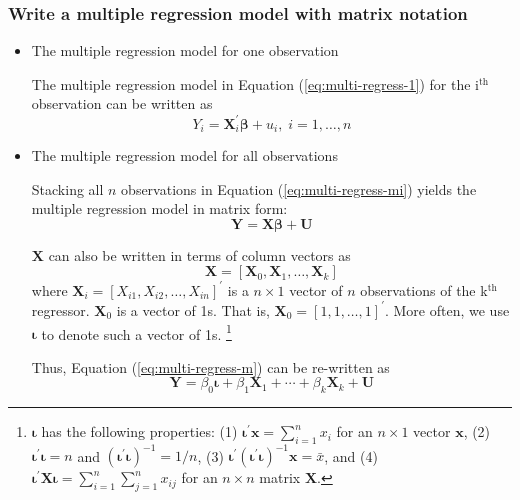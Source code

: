 \documentclass[a4paper,11pt]{article}
\begin{document}
\subsubsection*{Write a multiple regression model with matrix notation}
\label{sec:org8f35142}
\begin{itemize}
\item The multiple regression model for one observation
\label{sec:org8a2f15a}

The multiple regression model in Equation (\ref{eq:multi-regress-1})
for the i\(^{\text{th}}\) observation can be written as
\begin{equation}
\label{eq:multi-regress-mi}
Y_i = \mathbf{X}^{\prime}_i \boldsymbol{\beta} + u_i,\; i = 1, \ldots, n
\end{equation}

\item The multiple regression model for all observations
\label{sec:orgfdb6a2c}

Stacking all \(n\) observations in Equation (\ref{eq:multi-regress-mi})
yields the multiple regression model in matrix form:
\begin{equation}
\label{eq:multi-regress-m}
\mathbf{Y} = \mathbf{X} \boldsymbol{\beta} + \mathbf{U}
\end{equation}

\(\mathbf{X}\) can also be written in terms of column vectors as
\[
\mathbf{X} = [\boldsymbol{X}_0, \boldsymbol{X}_1, \ldots, \boldsymbol{X}_k ]
\]
where \(\boldsymbol{X}_i = [X_{i1}, X_{i2}, \ldots, X_{in}]^{\prime}\) is a
\(n \times 1\) vector of \(n\) observations of the k\(^{\text{th}}\)
regressor. \(\boldsymbol{X}_0\) is a vector of 1s. That is,
\(\boldsymbol{X}_0 = [1, 1, \ldots, 1]^{\prime}\). More often, we use
\(\boldsymbol{\iota}\) to denote such a vector of 1s. \footnote{\(\boldsymbol{\iota}\) has the following properties:
(1) \(\boldsymbol{\iota}^{\prime} \mathbf{x} = \sum_{i=1}^n x_i\) for an
  \(n \times 1\) vector \(\mathbf{x}\), (2) \(\boldsymbol{\iota}^{\prime}
\boldsymbol{\iota} = n\) and \(\left(\boldsymbol{\iota}^{\prime}
\boldsymbol{\iota} \right)^{-1} = 1/n\), (3)
\(\boldsymbol{\iota}^{\prime} \left(
\boldsymbol{\iota}^{\prime}\boldsymbol{\iota} \right)^{-1} \mathbf{x}
= \bar{x}\), and (4) \(\boldsymbol{\iota}^{\prime} \mathbf{X} \boldsymbol{\iota} =
  \sum_{i=1}^n \sum_{j=1}^n x_{ij}\) for an \(n \times n\) matrix \(\mathbf{X}\).}

Thus, Equation (\ref{eq:multi-regress-m}) can be re-written as
\begin{equation}
\label{eq:multi-regress-m2}
\mathbf{Y} = \beta_0\boldsymbol{\iota} + \beta_1\boldsymbol{X}_1 + \cdots + \beta_k\boldsymbol{X}_k + \mathbf{U}
\end{equation}
\end{itemize}
\end{document}
